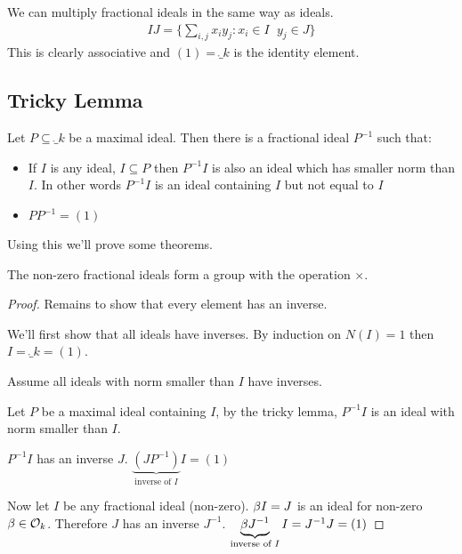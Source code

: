 \documentclass[11pt]{article}
\begin{document}
We can multiply fractional ideals in the same way as ideals.
\begin{align*}
	IJ = \{\sum_{i,j} x_iy_j : x_i \in I \hspace{7pt} y_j \in J\}
\end{align*}
This is clearly associative and $(1) = \ring_k$ is the identity element.

\subsection{Tricky Lemma}
\begin{lemma}
Let $P \subseteq \ring_k$ be a maximal ideal.
	Then there is a fractional ideal $P^{-1}$ such that:
	\begin{itemize}
		\item{If $I$ is any ideal, $I \subseteq P$ then $P^{-1} I $ is also an ideal which has smaller norm than $I$. In other words $P^{-1} I$ is an ideal containing $I$ but not equal to $I$ }
		\item{$PP^{-1} = (1)$}
	\end{itemize}
\end{lemma}
\spa
Using this we'll prove some theorems.

\begin{theorem}
The non-zero fractional ideals form a group with the operation $\times$.
\end{theorem}

\begin{proof}
Remains to show that every element has an inverse.

We'll first show that all ideals have inverses. 
	By induction on $N(I) = 1$ then $I= \ring_k = (1)$.
\spa

	Assume all ideals with norm smaller than $I$ have inverses.
	\spa

	Let $P$ be a maximal ideal containing $I$, by the tricky lemma, $P^{-1} I$ is an ideal with norm smaller than $I$.
\spa

	$P^{-1}I$ has an inverse $J$. $\underbrace{(JP^{-1})}_\text{inverse of $I$} I = (1)$

\spa

	Now let $I$ be any fractional ideal (non-zero). $\beta I=J$ is an ideal for non-zero $\beta \in \mathcal{O}_k$. Therefore $J$ has an inverse $J^{-1}$. \hspace{7pt} $\underbrace{\beta J^{-1}}_\text{inverse of $I$} I = J^{-1} J = (1)$ 


\end{proof}
		    
\end{document}
